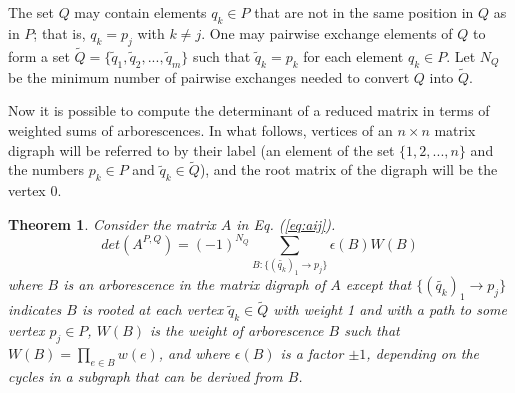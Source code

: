 \documentclass{article}
\newtheorem{theorem}{Theorem}
\begin{document}
The set $Q$ may contain elements $q_k \in P$ that are not
in the same position in $Q$ as in $P$; that is, $q_k = p_j$ with $k \ne j$.
One may pairwise exchange elements of $Q$ to form a set
$\tilde{Q} = \{\tilde{q}_1, \tilde{q}_2, ..., \tilde{q}_m\}$ such that
$\tilde{q}_k = p_k$ for each element $q_k \in P$.
Let $N_Q$ be
the minimum number of pairwise exchanges needed to convert $Q$ into $\tilde{Q}$.

Now it is possible to compute the determinant of a reduced matrix
in terms of weighted sums of arborescences.  In what follows, vertices of
an $n \times n$
matrix digraph will be referred to by their label (an element of the
set $\{1, 2, ..., n\}$ and the numbers $p_k \in P$ and
$\tilde{q}_k \in \tilde{Q}$),
and the root matrix of the digraph will be the vertex $0$.

\begin{theorem}
Consider the matrix $A$ in Eq. (\ref{eq:aij}).
\begin{equation}
det(A^{P, Q}) = \left(-1\right)^{N_Q} \sum_{B: \{(\tilde{q_k})_1 \to p_j\}}
\epsilon(B) W(B)
\label{eq:detapq}
\end{equation}
where $B$ is an arborescence in the matrix digraph of
$A$ except that $\{(\tilde{q_k})_1 \to p_j\}$
indicates $B$ is rooted at each vertex
$\tilde{q}_k \in \tilde{Q}$ with weight 1 and with a path to some
vertex $p_j \in P$, $W(B)$ is the weight of arborescence $B$ such that $W(B) = \prod_{e \in B} w(e)$, and where $\epsilon(B)$ is a factor $\pm 1$, depending
on the cycles in a subgraph that can be derived from $B$.
\label{theorem:reduced}
\end{theorem}
\end{document}
